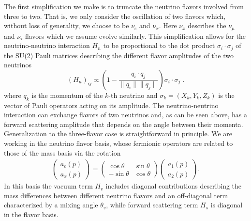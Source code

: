 \documentclass[Dual]{msu-thesis}
\begin{document}
The first simplification we make is to truncate the neutrino flavors involved from three to two. That is, we only consider the oscillation of two flavors which, without loss of generality, we choose to be $\nu_e$ and $\nu_x$. Here $\nu_x$ describes the $\nu_\mu$ and $\nu_\tau$ flavors which we assume evolve similarly. This simplification allows for the neutrino-neutrino interaction $H_n$ to be proportional to the dot product ${\sigma}_i \cdot {\sigma}_j$ of the SU(2) Pauli matrices
describing the different flavor amplitudes of the two neutrinos
\begin{equation}
\label{eq:fws_int}
(H_n)_{ij}\propto \left(1-\frac{{q}_i\cdot{q}_j}{\|{q}_i\|\|{q}_j\|}\right){\sigma}_i\cdot{\sigma}_j\;.
\end{equation}
where ${q}_k$ is the momentum of the $k$-th neutrino and ${\sigma}_k=(X_k,Y_k,Z_k)$ is the vector of Pauli operators acting on its amplitude. The neutrino-neutrino interaction can exchange
flavors of two neutrinos and, as can be seen above, has a forward scattering amplitude that depends on the angle between their momenta. Generalization to the three-flavor case is straightforward in principle. We are working in the neutrino flavor basis, whose fermionic operators are related to those of the mass basis via the rotation
\begin{align}
\label{flavor_mass_rotation}
\begin{pmatrix}
a_e(p) \\ a_x(p)
\end{pmatrix}
=
\begin{pmatrix}
\cos\theta & \sin\theta \\
-\sin\theta & \cos\theta 
\end{pmatrix}
\begin{pmatrix}
a_1(p) \\ a_2(p)
\end{pmatrix}
.\end{align}
In this basis the vacuum term $H_v$ includes diagonal contributions describing the mass differences between different neutrino flavors and an off-diagonal term characterized by a mixing angle $\theta_v$, while forward scattering term $H_s$ is diagonal in the flavor basis.
\end{document}
